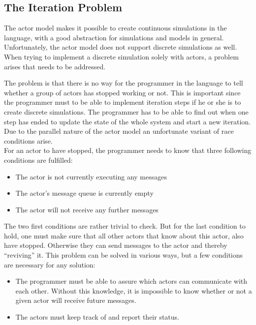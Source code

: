 \subsection{The Iteration Problem}\label{iterprob}

The actor model makes it possible to create continuous simulations in the language, with a good abstraction for simulations and models in general. Unfortunately, the actor model does not support discrete simulations as well. When trying to implement a discrete simulation solely with actors, a problem arises that needs to be addressed.

The problem is that there is no way for the programmer in the language to tell whether a group of actors has stopped working or not. This is important since the programmer must to be able to implement iteration steps if he or she is to create discrete simulations. The programmer has to be able to find out when one step has ended to update the state of the whole system and start a new iteration. Due to the parallel nature of the actor model an unfortunate variant of race conditions arise.\\

For an actor to have stopped, the programmer needs to know that three following conditions are fulfilled:
\begin{itemize}
\item The actor is not currently executing any messages
\item The actor's message queue is currently empty
\item The actor will not receive any further messages
\end{itemize} 

The two first conditions are rather trivial to check. But for the last condition to hold, one must make sure that all other actors that know about this actor, also have stopped. Otherwise they can send messages to the actor and thereby \enquote{reviving} it. This problem can be solved in various ways, but a few conditions are necessary for any solution:

\begin{itemize}
\item The programmer must be able to assure which actors can communicate with each other. Without this knowledge, it is impossible to know whether or not a given actor will receive future messages.
\item The actors must keep track of and report their status.
\end{itemize} 

